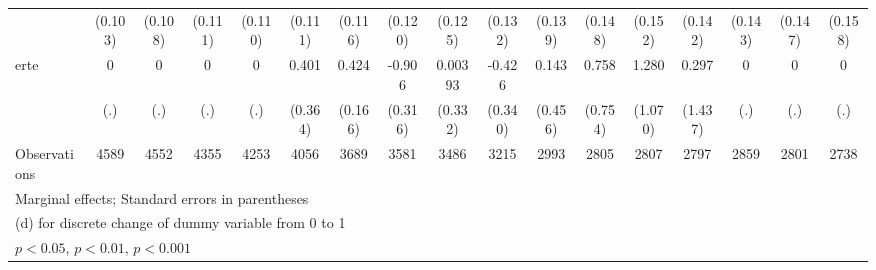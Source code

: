 {\begin{tabular}{l*{16}{c}}
                    &     (0.103)         &     (0.108)         &     (0.111)         &     (0.110)         &     (0.111)         &     (0.116)         &     (0.120)         &     (0.125)         &     (0.132)         &     (0.139)         &     (0.148)         &     (0.152)         &     (0.142)         &     (0.143)         &     (0.147)         &     (0.158)         \\
[1em]
erte                &           0         &           0         &           0         &           0         &       0.401         &       0.424\sym{*}  &      -0.906\sym{**} &     0.00393         &      -0.426         &       0.143         &       0.758         &       1.280         &       0.297         &           0         &           0         &           0         \\
                    &         (.)         &         (.)         &         (.)         &         (.)         &     (0.364)         &     (0.166)         &     (0.316)         &     (0.332)         &     (0.340)         &     (0.456)         &     (0.754)         &     (1.070)         &     (1.437)         &         (.)         &         (.)         &         (.)         \\
\hline
Observations        &        4589         &        4552         &        4355         &        4253         &        4056         &        3689         &        3581         &        3486         &        3215         &        2993         &        2805         &        2807         &        2797         &        2859         &        2801         &        2738         \\
\hline\hline
\multicolumn{17}{l}{\footnotesize Marginal effects; Standard errors in parentheses}\\
\multicolumn{17}{l}{\footnotesize  (d) for discrete change of dummy variable from 0 to 1}\\
\multicolumn{17}{l}{\footnotesize \sym{*} \(p<0.05\), \sym{**} \(p<0.01\), \sym{***} \(p<0.001\)}\\
\end{tabular}
}
